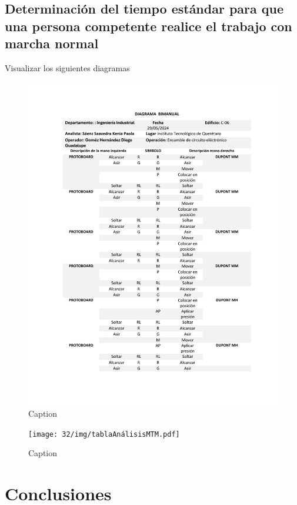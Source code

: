     \subsection{Determinación del tiempo estándar para que una persona competente realice el trabajo con marcha normal}
    Visualizar los siguientes diagramas
    \begin{figure}[H]
        \centering
        \includegraphics[scale=0.4]{32/img/diagramaBimanual.pdf}
        \caption{Caption}
        \label{fig:enter-label}
    \end{figure}
    \begin{figure}[H]
        \centering
        \texttt{[image: 32/img/tablaAnálisisMTM.pdf]}
        \caption{Caption}
        \label{fig:enter-label}
    \end{figure}
    \section{Conclusiones}
    
